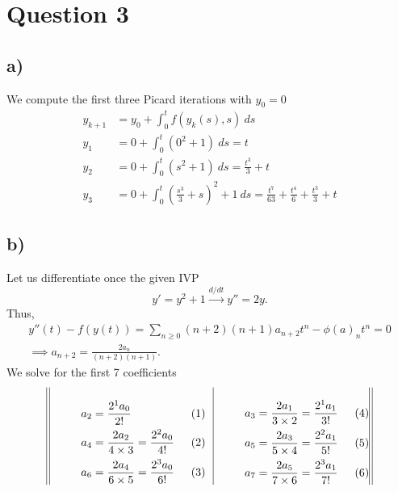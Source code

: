 \documentclass[
	12pt,
	]{article}
\theoremstyle{definition}
\theoremstyle{definition}
\theoremstyle{definition}
\theoremstyle{definition}
\theoremstyle{definition}
\theoremstyle{example}
\theoremstyle{note}
\theoremstyle{remark}
\theoremstyle{example}
\begin{document}
		\section*{Question 3}
			\subsection*{a) }
				We compute the first three Picard iterations with $y_{0} = 0$
				\begin{align*}
					y_{k+1} & = y_{0} + \int_{0}^{t} f(y_{k}(s), s) \ ds \\
					y_{1} &= 0 + \int_{0}^{t} (0^{2} +1) \ ds = t\\
					y_{2} &= 0 + \int_{0}^{t} (s^{2} +1) \ ds = \frac{t^{3}}{3} + t \\
					y_{3} &= 0 + \int_{0}^{t} \left(\frac{s^{3}}{3} + s\right)^{2} +1 \ ds = \frac{t^{7}}{63} + \frac{t^{4}}{6} + \frac{t^{3}}{3} + t
				\end{align*}
			\subsection*{b) }
				Let us differentiate once the given IVP 
				$$ y'= y^{2} +1 \xrightarrow{d/dt} y'' = 2y.$$
				Thus, 
				\begin{gather*} 
				y''(t) - f(y(t)) = \sum_{n\ge 0} (n+2)(n+1) a_{n+2}t^{n}- \phi(a)_{n}t^{n} = 0 \\ 
				\implies a_{n+2} = \frac{2a_{n}}{(n+2)(n+1)}.
				\end{gather*}
				We solve for the first 7 coefficients
				\begin{equation*}
				\vrule \: \vrule  \begin{minipage}{0.4\linewidth}
					\begin{align*}
						a_{2} &= \frac{2^{1}a_{0}}{2 !}\\
						a_{4} &=  \frac{2a_{2}}{4\times 3} = \frac{2^{2} a_{0}}{4!}\\
						a_{6} &= \frac{2a_{4}}{6\times 5} = \frac{2^{3}a_{0}}{6!}
					\end{align*}	
				\end{minipage} \ \ \vrule 
				\begin{minipage}{0.4\linewidth}
					\begin{align*}
											a_{3} &= \frac{2a_{1}}{3\times 2} = \frac{2^{1} a_{1}}{3!}\\
											a_{5} &= \frac{2a_{3}}{5\times 4} =\frac{2^{2}a_{1}}{5!} \\
											a_{7} &= \frac{2a_{5}}{7\times 6} = \frac{2^{3}a_{1}}{7!}
										\end{align*}
				\end{minipage}\vrule  \: \vrule 
			\end{equation*}
			
\end{document}
